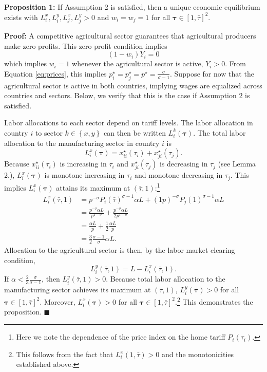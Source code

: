 \documentclass{puthesis}
\begin{document}
\textbf{Proposition 1:} If Assumption 2 is satisfied, then a unique
economic equilibrium exists with \(L_i^x, L_i^y, L_j^x, L_j^y > 0\) and
\(w_i = w_j = 1\) for all \(\bm{\tau} \in [1, \bar{\tau}]^2\).

\textbf{Proof:} A competitive agricultural sector guarantees that
agricultural producers make zero profits. This zero profit condition
implies \[
\left( 1 - w_i \right) Y_i = 0
\] which implies \(w_i = 1\) whenever the agricultural sector is active,
\(Y_i > 0\). From Equation \ref{eq:prices}, this implies
\(p_i^\star = p_j^\star = p^\star = \frac{\sigma}{\sigma - 1}\). Suppose
for now that the agricultural sector is active in both countries,
implying wages are equalized across countries and sectors. Below, we
verify that this is the case if Assumption 2 is satisfied.

Labor allocations to each sector depend on tariff levels. The labor
allocation in country \(i\) to sector \(k \in \left\{ x, y \right\}\)
can then be written \(L_i^k(\bm{\tau})\). The total labor allocation to
the manufacturing sector in country \(i\) is \[
L_i^x(\bm{\tau}) = x_{ii}^\star(\tau_i) + x_{ji}^\star(\tau_j) .
\] Because \(x_{ii}^\star(\tau_i)\) is increasing in \(\tau_i\) and
\(x_{ji}^\star(\tau_j)\) is decreasing in \(\tau_j\) (see Lemma 2.),
\(L_i^x(\bm{\tau})\) is monotone increasing in \(\tau_i\) and monotone
decreasing in \(\tau_j\). This implies \(L_i^x(\bm{\tau})\) attains its
maximum at \(\left( \bar{\tau}, 1 \right)\):\footnote{Here we note the
  dependence of the price index on the home tariff \(P_i(\tau_i)\).}
\begin{align*}
L_i^x(\bar{\tau}, 1) &= p^{-\sigma} P_i(\bar{\tau})^{\sigma - 1} \alpha L + (1 p)^{-\sigma} P_j(1)^{\sigma - 1} \alpha L \\
&= \frac{p^{-\sigma} \alpha L}{p^{1 - \sigma}} + \frac{p^{-\sigma} \alpha L}{2 p^{1 - \sigma}} \\
&= \frac{\alpha L}{p} + \frac{1}{2} \frac{\alpha L}{p} \\
&= \frac{3}{2} \frac{\sigma - 1}{\sigma} \alpha L .
\end{align*} Allocation to the agricultural sector is then, by the labor
market clearing condition, \[
L_i^y(\bar{\tau}, 1) = L - L_i^x(\bar{\tau}, 1) .
\] If \(\alpha < \frac{2}{3} \frac{\sigma}{\sigma - 1}\), then
\(L_i^y(\bar{\tau}, 1) > 0\). Because total labor allocation to the
manufacturing sector achieves its maximum at
\(\left( \bar{\tau}, 1 \right)\), \(L_i^y(\bm{\tau}) > 0\) for all
\(\bm{\tau} \in [1, \bar{\tau}]^2\). Moreover, \(L_i^x(\bm{\tau}) > 0\)
for all \(\bm{\tau} \in [1, \bar{\tau}]^2\).\footnote{This follows from
  the fact that \(L_i^x(1, \bar{\tau}) > 0\) and the monotonicities
  established above.} This demonstrates the proposition.
\(\blacksquare\)
\end{document}
